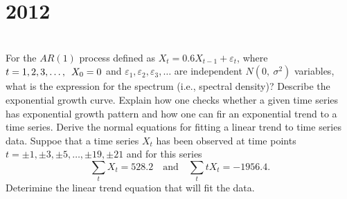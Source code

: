 \section*{2012}
\vspace{-.5cm}
\hrulefill \smallskip\\
 For the $AR(1)$ process defined as $X_t = 0.6X_{t-1} + \varepsilon_t$, where $t = 1,2,3,\ldots, \enskip X_0 =0$ and $\varepsilon_1,\varepsilon_2,\varepsilon_3,\ldots$ are independent $N(0,\:\sigma^2)$ variables, what is the expression for the spectrum (i.e., spectral density)?
\myline
{} Describe the exponential growth curve. Explain how one checks whether a given time series has exponential growth pattern and how one can fir an exponential trend to a time series.
\myline
{} Derive the normal equations for fitting a linear trend to time series data. Suppoe that a time series $X_t$ has been observed at time points $t= \pm1, \pm3,\pm5,\dotsc,\pm 19,\pm21$ and for this series
\[ \sum_{t} X_t = 528.2 \quad \text{and} \quad \sum_{t} tX_t = -1956.4.\] Deterimine the linear trend equation that will fit the data. 
